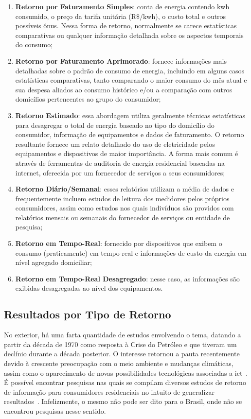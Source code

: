 \begin{enumerate}
\item \textbf{Retorno por Faturamento Simples}: conta de energia contendo
k\acs{wh}
consumido, o preço da tarifa unitária ($\text{R\$}/$k\acs{wh}), o custo
total e outros possíveis ônus. Nessa forma de retorno, normalmente se carece
estatísticas comparativas ou qualquer informação detalhada sobre os aspectos
temporais do consumo;
\item \textbf{Retorno por Faturamento Aprimorado}: fornece informações mais
detalhadas
sobre o padrão de consumo de energia, incluindo em alguns casos estatísticas
comparativas, tanto comparando o maior consumo do mês atual e sua despesa
aliados ao consumo histórico e/ou a comparação com outros domicílios
pertencentes ao grupo do consumidor;
\item \textbf{Retorno Estimado}: essa abordagem utiliza geralmente técnicas
estatísticas para desagregar o total de energia baseado no tipo do
domicílio do consumidor, informação de equipamentos e dados de faturamento. O
retorno resultante fornece um relato detalhado do uso de eletricidade pelos
equipamentos e dispositivos de maior importância. A forma mais comum é através de
ferramentas de auditoria de energia residencial baseadas na internet, oferecida
por um fornecedor de serviços a seus consumidores;
\item \textbf{Retorno Diário/Semanal}: esses relatórios utilizam a média de
dados e frequentemente incluem estudos de leitura dos medidores pelos próprios
consumidores, assim como estudos nos quais indivíduos são providos com
relatórios mensais ou semanais do fornecedor de serviços ou entidade de
pesquisa;
\item \textbf{Retorno em Tempo-Real}: fornecido por dispositivos que exibem o
consumo (praticamente) em tempo-real e informações de custo da energia em nível
agregado domiciliar;
\item \textbf{Retorno em Tempo-Real Desagregado}: nesse caso, as informações são
exibidas desagregadas ao nível dos equipamentos.
\end{enumerate}

\subsection{Resultados por Tipo de Retorno}
\label{ssec:ret_eff}

No exterior, há uma farta quantidade de estudos envolvendo o tema, datando a
partir da década de 1970 como resposta à Crise do Petróleo e que tiveram um
declínio durante a década posterior. O interesse retornou a pauta recentemente
devido à crescente preocupação com o meio ambiente e mudanças climáticas, assim
como o aparecimento de novas possibilidades tecnológicas associadas a
\gls{ict}~\cite{aceee_2010_estudos_feedback}. É possível encontrar pesquisas nas
quais se compilam diversos estudos de retorno de informação para consumidores
residenciais no intuito de generalizar
resultados~\cite{aceee_2010_estudos_feedback,2011_zhifeng_smart_energy_savings,
2006_darby,2009_nber_studies_us,ucla_studies_1975_2011_usa}.
Infelizmente, o mesmo não pode ser dito para o Brasil, onde não se
encontrou pesquisas nesse sentido.

